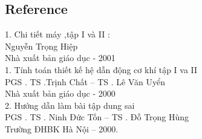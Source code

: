 \documentclass{article} %
\begin{document}
\begin{titlepage}
\thispagestyle{empty}

\cleardoublepage
\tableofcontents 
\thispagestyle{empty}
\cleardoublepage


{\let\oldnumberline\numberline
\renewcommand{\numberline}{Figure~\oldnumberline}
\listoffigures} 
\newpage

{\let\oldnumberline\numberline
\renewcommand{\numberline}{Bảng~\oldnumberline}
\listoftables}
\newpage
\justifying

 
 


\newpage
\section*{Reference}
1.	Chi tiết máy ,tập I và II :           \\       
Nguyễn Trọng Hiệp\\
          			   	   Nhà xuất bản giáo dục - 2001\\
1.	Tính toán thiết kế hệ dẫn động cơ khí  tập I va II\\
PGS . TS .Trịnh Chất – TS . Lê Văn Uyển\\
               		 Nhà xuất bản giáo dục - 2000\\
2.	Hướng dẫn làm bài tập dung sai \\
 PGS . TS . Ninh Đức Tốn – TS . Đỗ Trọng Hùng \\
             		  Trường ĐHBK Hà Nội – 2000.\\

\end{titlepage}
\end{document}
